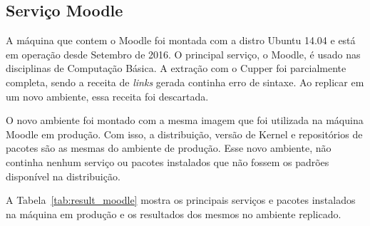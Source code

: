 \subsection{Serviço Moodle}

A máquina que contem o Moodle foi montada com a distro Ubuntu 14.04 e
está em operação desde Setembro de 2016. O principal serviço, o Moodle,
é usado nas disciplinas de Computação Básica.
A extração com o Cupper foi parcialmente completa, sendo a receita de \textit{links}
gerada continha erro de sintaxe. Ao replicar em um novo ambiente, essa receita
foi descartada.

O novo ambiente foi montado com a mesma imagem que foi utilizada na máquina
Moodle em produção. Com isso, a distribuição, versão de Kernel e repositórios
de pacotes são as mesmas do ambiente de produção. Esse novo ambiente, não
continha nenhum serviço ou pacotes instalados que não fossem os padrões
disponível na distribuição.

A Tabela~\ref{tab:result_moodle} mostra os principais serviços e pacotes instalados
na máquina em produção e os resultados dos mesmos no ambiente replicado.

